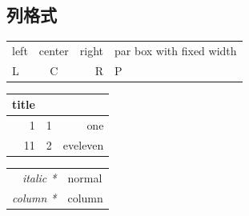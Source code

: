 \documentclass{ctexart}
\begin{document}
		\subsection{列格式}
			\begin{tabular}{l|c|r|p{6em}}
				\hline
				left&center&right
					&par box with fixed width\\
				L	&	C	&	R	&P	\\
				\hline
				
			\end{tabular}
			\par
			\begin{tabular}{@{}r @{:}l| r @{}}
				\hline
				title \\
				\hline
				1 & 1 & one \\
				11 & 2 & eveleven \\
				\hline
			\end{tabular}
			\par
			\begin{tabular}{>{\itshape}r<{*}l}
				\hline
				italic & normal \\
				column & column \\
				\hline
			\end{tabular}
\end{document}
